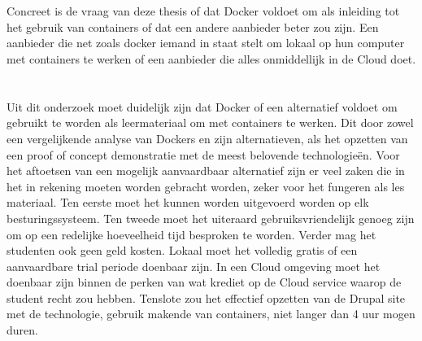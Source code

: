 \section{}
\label{sec:onderzoeksvraag}

Concreet is de vraag van deze thesis of dat Docker voldoet om als inleiding tot het gebruik van containers of dat een andere aanbieder beter zou zijn. Een aanbieder die net zoals docker iemand in staat stelt om lokaal op hun computer met containers te werken of een aanbieder die alles onmiddellijk  in de Cloud doet.

\section{}
\label{sec:onderzoeksdoelstelling}

Uit dit onderzoek moet duidelijk zijn dat Docker of een alternatief voldoet om gebruikt te worden als leermateriaal om met containers te werken. Dit door zowel een vergelijkende analyse van Dockers en zijn alternatieven, als het opzetten van een proof of concept demonstratie met de meest belovende technologieën.
Voor het aftoetsen van een mogelijk aanvaardbaar alternatief zijn er veel zaken die in het in rekening moeten worden gebracht worden, zeker voor het fungeren als les materiaal. Ten eerste moet het kunnen worden uitgevoerd worden op elk besturingssysteem. Ten tweede moet het uiteraard gebruiksvriendelijk genoeg zijn om op een redelijke hoeveelheid tijd besproken te worden.  Verder mag het studenten ook geen geld kosten. Lokaal moet het volledig gratis of een aanvaardbare trial periode doenbaar zijn. In een Cloud omgeving moet het doenbaar zijn binnen de perken van wat krediet op de Cloud service waarop de student recht zou hebben. Tenslote zou het effectief opzetten van de Drupal site met de technologie, gebruik makende van containers, niet langer dan 4 uur mogen duren.

